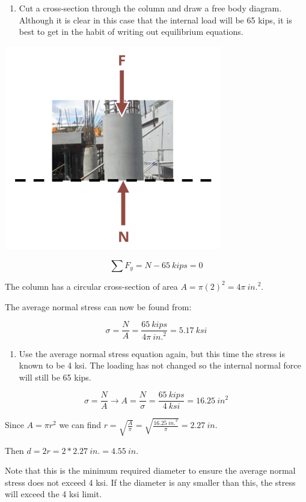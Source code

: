 \documentclass[
  letterpaper,
  DIV=11,
  numbers=noendperiod]{scrreprt}
\providecommand{\tightlist}{%
  \setlength{\itemsep}{0pt}\setlength{\parskip}{0pt}}\usepackage{longtable,booktabs,array}
\theoremstyle{definition}
\theoremstyle{remark}
\begin{document}
\begin{tcolorbox}
\begin{tcolorbox}
\begin{enumerate}
\def\labelenumi{\arabic{enumi}.}
\tightlist
\item
  Cut a cross-section through the column and draw a free body diagram.
  Although it is clear in this case that the internal load will be 65
  kips, it is best to get in the habit of writing out equilibrium
  equations.
\end{enumerate}

\begin{center}
\includegraphics[width=3.73958in,height=\textheight]{images/CH2 figures/example 2.1 part 2.png}
\end{center}

\[
\sum F_y= N-65{~kips}=0
\]

The column has a circular cross-section of area
\(A=\pi(2)^2=4 \pi{~in.}^2\).

The average normal stress can now be found from:

\[
\sigma=\frac{N}{A}=\frac{65{~kips}}{4 \pi{~in.}^2}=5.17{~ksi}
\]

\begin{enumerate}
\def\labelenumi{\arabic{enumi}.}
\setcounter{enumi}{1}
\tightlist
\item
  Use the average normal stress equation again, but this time the stress
  is known to be 4 ksi. The loading has not changed so the internal
  normal force will still be 65 kips.
\end{enumerate}

\[
\sigma=\frac{N}{A} \rightarrow A=\frac{N}{\sigma}=\frac{65{~kips}}{4{~ksi}}=16.25 {~in}^2
\]

Since \(A=\pi r^2\) we can find
\(r=\sqrt{\frac{A}{\pi}}=\sqrt{\frac{16.25{~in.}^2}{\pi}}=2.27{~in}\).

Then \(d=2 r=2 * 2.27{~in.}=4.55{~in.}\)

Note that this is the minimum required diameter to ensure the average
normal stress does not exceed 4 ksi. If the diameter is any smaller than
this, the stress will exceed the 4 ksi limit.

\end{tcolorbox}

\end{tcolorbox}
\end{document}
